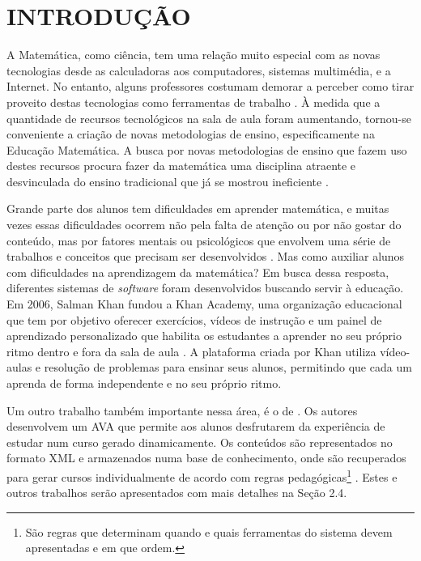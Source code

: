 \section{INTRODUÇÃO}

A Matemática, como ciência, tem uma relação muito especial com as novas tecnologias desde as calculadoras aos computadores, sistemas multimédia, e a Internet. No entanto, alguns professores costumam demorar a perceber como tirar proveito destas tecnologias como ferramentas de trabalho \cite{da1997ensino}. \`A medida que a quantidade de recursos tecnológicos na sala de aula foram aumentando, tornou-se conveniente a criação de novas metodologias de ensino, especificamente na Educação Matemática. A 
busca por novas metodologias de ensino que fazem uso destes recursos procura fazer da matemática uma disciplina atraente e desvinculada do ensino tradicional que já se mostrou ineficiente 
\cite{silva2009ambiente}.

Grande parte dos alunos tem dificuldades em aprender matemática, e muitas vezes essas dificuldades ocorrem não pela falta de atenção ou por não gostar do conteúdo, mas por fatores mentais ou 
psicológicos que envolvem uma série de trabalhos e conceitos que precisam ser desenvolvidos \cite{sa2015software}. Mas como auxiliar alunos com dificuldades na aprendizagem da matemática? Em busca dessa resposta, diferentes sistemas de \textit{software} foram desenvolvidos buscando servir \`a  educação. Em 2006, Salman Khan fundou a Khan Academy, uma organização educacional que tem 
por objetivo oferecer exercícios, vídeos de instrução e um painel de aprendizado personalizado que habilita os estudantes a aprender no seu próprio ritmo dentro e fora da sala de aula 
\cite{khan2012one}. A plataforma criada por Khan utiliza vídeo-aulas e resolução de problemas para ensinar seus alunos, permitindo que cada um aprenda de forma independente e no seu pr\'oprio ritmo.

Um outro trabalho também  importante nessa área, \'e o de  . Os autores desenvolvem um AVA que permite aos alunos desfrutarem da experiência de estudar num curso 
gerado dinamicamente. Os conte\'udos s\~ao representados no formato XML \cite{bray1998extensible} e armazenados numa base de conhecimento, onde s\~ao recuperados para gerar cursos individualmente de 
acordo com regras pedagógicas\footnote{S\~ao regras que determinam quando e quais ferramentas do sistema devem apresentadas e em que ordem.} \cite{melis2004activemath}. Estes e outros trabalhos serão 
apresentados com mais detalhes na Seção 2.4.

